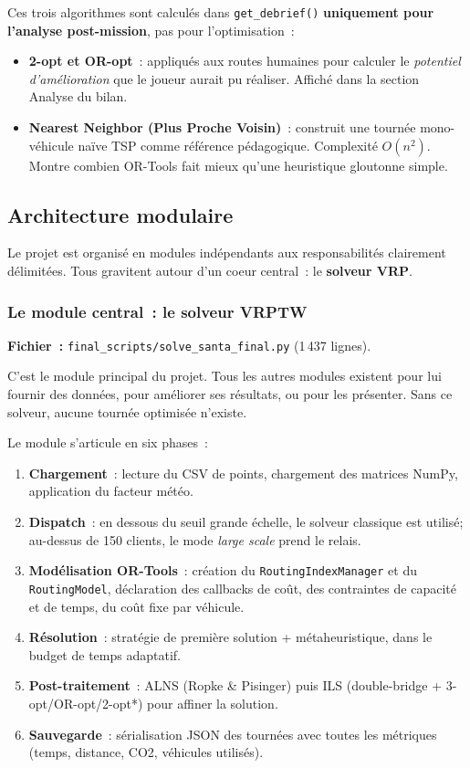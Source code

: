 \documentclass[a4paper, 12pt, twoside]{article}
\begin{document}
Ces trois algorithmes sont calcul\'{e}s dans \texttt{get\_debrief()} \textbf{uniquement
pour l'analyse post-mission}, pas pour l'optimisation~:
\begin{itemize}
  \item \textbf{2-opt et OR-opt}~: appliqu\'{e}s aux routes humaines pour calculer le
        \emph{potentiel d'am\'{e}lioration} que le joueur aurait pu r\'{e}aliser. Affich\'{e}
        dans la section \og Analyse \fg{} du bilan.
  \item \textbf{Nearest Neighbor (Plus Proche Voisin)}~: construit une tourn\'{e}e mono-v\'{e}hicule
        na\"ive TSP comme r\'{e}f\'{e}rence p\'{e}dagogique. Complexit\'{e} $O(n^2)$.
        Montre combien OR-Tools fait mieux qu'une heuristique gloutonne simple.
\end{itemize}

\subsection{Architecture modulaire}

Le projet est organis\'{e} en modules ind\'{e}pendants aux responsabilit\'{e}s clairement
d\'{e}limit\'{e}es. Tous gravitent autour d'un coeur central~: le \textbf{solveur VRP}.

\subsubsection{Le module central~: le solveur VRPTW}

\textbf{Fichier~:} \texttt{final\_scripts/solve\_santa\_final.py} (1\,437 lignes).

C'est le module principal du projet. Tous les autres modules existent pour lui fournir
des donn\'{e}es, pour am\'{e}liorer ses r\'{e}sultats, ou pour les pr\'{e}senter. Sans ce
solveur, aucune tourn\'{e}e optimis\'{e}e n'existe.

Le module s'articule en six phases~:
\begin{enumerate}
  \item \textbf{Chargement}~: lecture du CSV de points, chargement des matrices NumPy, application du facteur m\'{e}t\'{e}o.
  \item \textbf{Dispatch}~: en dessous du seuil grande \'{e}chelle, le solveur classique est utilis\'{e}; au-dessus de 150 clients, le mode \textit{large scale} prend le relais.
  \item \textbf{Mod\'{e}lisation OR-Tools}~: cr\'{e}ation du \texttt{RoutingIndexManager} et du \texttt{RoutingModel}, d\'{e}claration des callbacks de co\^{u}t, des contraintes de capacit\'{e} et de temps, du co\^{u}t fixe par v\'{e}hicule.
  \item \textbf{R\'{e}solution}~: strat\'{e}gie de premi\`{e}re solution + m\'{e}taheuristique, dans le budget de temps adaptatif.
  \item \textbf{Post-traitement}~: ALNS (Ropke \& Pisinger) puis ILS (double-bridge + 3-opt/OR-opt/2-opt*) pour affiner la solution.
  \item \textbf{Sauvegarde}~: s\'{e}rialisation JSON des tourn\'{e}es avec toutes les m\'{e}triques (temps, distance, CO2, v\'{e}hicules utilis\'{e}s).
\end{enumerate}
\end{document}
